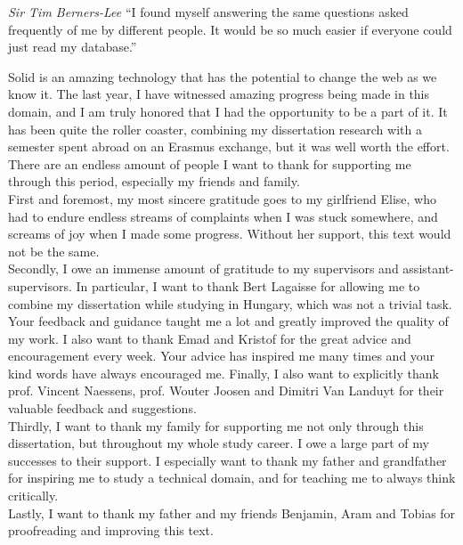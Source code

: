 \begin{preface}
\begin{fancyquote}{\textit{Sir Tim Berners-Lee}}
``I found myself answering the same questions asked frequently of me by different people. It would be so much easier if everyone could just read my database.''
\end{fancyquote}

\noindent Solid is an amazing technology that has the potential to change the web as we know it. The last year, I have witnessed amazing progress being made in this domain, and I am truly honored that I had the opportunity to be a part of it. It has been quite the roller coaster, combining my dissertation research with a semester spent abroad on an Erasmus exchange, but it was well worth the effort. There are an endless amount of people I want to thank for supporting me through this period, especially my friends and family.\\

\noindent First and foremost, my most sincere gratitude goes to my girlfriend Elise, who had to endure endless streams of complaints when I was stuck somewhere, and screams of joy when I made some progress. Without her support, this text would not be the same.\\

\noindent Secondly, I owe an immense amount of gratitude to my supervisors and assistant-supervisors. 
In particular, I want to thank Bert Lagaisse for allowing me to combine my dissertation while studying in Hungary, which was not a trivial task. Your feedback and guidance taught me a lot and greatly improved the quality of my work. I also want to thank Emad and Kristof for the great advice and encouragement every week. Your advice has inspired me many times and your kind words have always encouraged me. Finally, I also want to explicitly thank prof. Vincent Naessens, prof. Wouter Joosen and Dimitri Van Landuyt for their valuable feedback and suggestions.\\

\noindent Thirdly, I want to thank my family for supporting me not only through this dissertation, but throughout my whole study career. I owe a large part of my successes to their support. I especially want to thank my father and grandfather for inspiring me to study a technical domain, and for teaching me to always think critically.\\

\noindent Lastly, I want to thank my father and my friends Benjamin, Aram and Tobias for proofreading and improving this text. 

\end{preface}